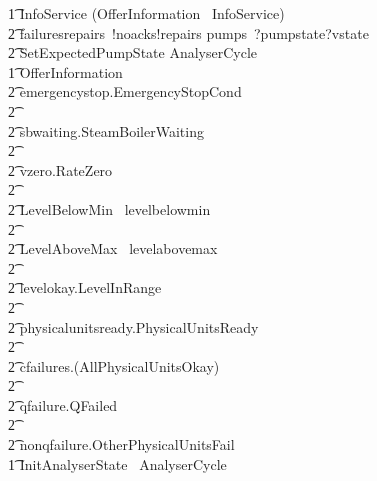 \documentclass{report} %
\begin{document}
\begin{circus}
    \t1 InfoService \circdef (OfferInformation \circseq\ InfoService) \extchoice \\
            \t2 failuresrepairs~!noacks!repairs \then pumps~?pumpstate?vstate \then \\
            \t2 \lschexpract SetExpectedPumpState \rschexpract \circseq AnalyserCycle \\ %
    \t1 OfferInformation \circdef \\
            \t2 emergencystop.EmergencyStopCond \then \Skip \\ \t2 \extchoice \\ %
            \t2 sbwaiting.SteamBoilerWaiting \then \Skip \\ \t2 \extchoice \\
            \t2 vzero.RateZero \then \Skip \\ \t2 \extchoice \\ %
            \t2 \lcircguard LevelBelowMin \rcircguard \circguard\ levelbelowmin \then \Skip \\ \t2 \extchoice \\
            \t2 \lcircguard LevelAboveMax \rcircguard \circguard\ levelabovemax \then \Skip \\ \t2 \extchoice \\ %
            \t2 levelokay.LevelInRange \then \Skip \\ \t2 \extchoice \\ %
            \t2 physicalunitsready.PhysicalUnitsReady \then \Skip \\ \t2 \extchoice  \\ %
            \t2 cfailures.(\lnot AllPhysicalUnitsOkay) \then \Skip \\ \t2 \extchoice \\
            \t2 qfailure.QFailed \then \Skip \\ \t2 \extchoice \\ %
            \t2 nonqfailure.OtherPhysicalUnitsFail \then \Skip \\
    \t1 \circspot \lschexpract InitAnalyserState \rschexpract \circseq\ AnalyserCycle \\
    \circend
\end{circus}
\end{document}
